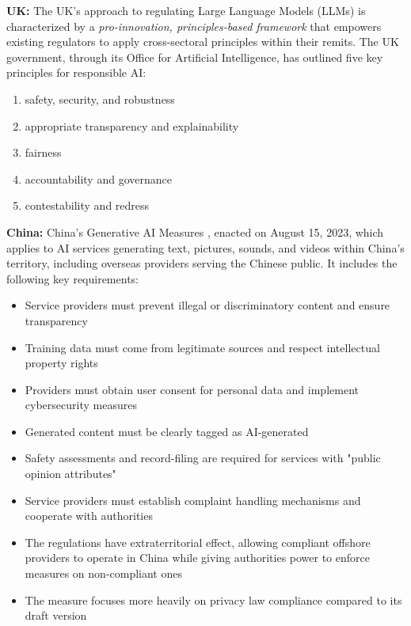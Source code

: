 \textbf{UK:} The UK's approach to regulating Large Language Models (LLMs)  is characterized by a \textit{pro-innovation, principles-based framework} that empowers existing regulators to apply cross-sectoral principles within their remits. The UK government, through its Office for Artificial Intelligence, has outlined five key principles for responsible AI:
\begin{enumerate}
    \item safety, security, and robustness
    \item appropriate transparency and explainability
    \item fairness
    \item accountability and governance
    \item contestability and redress
\end{enumerate}

\textbf{China:} China's Generative AI Measures , enacted on August 15, 2023, which applies to AI services generating text, pictures, sounds, and videos within China's territory, including overseas providers serving the Chinese public. It includes the following key requirements:
\begin{itemize}
    \item Service providers must prevent illegal or discriminatory content and ensure transparency
    \item Training data must come from legitimate sources and respect intellectual property rights
    \item Providers must obtain user consent for personal data and implement cybersecurity measures
    \item Generated content must be clearly tagged as AI-generated
    \item Safety assessments and record-filing are required for services with "public opinion attributes"
    \item Service providers must establish complaint handling mechanisms and cooperate with authorities
    \item The regulations have extraterritorial effect, allowing compliant offshore providers to operate in China while giving authorities power to enforce measures on non-compliant ones
    \item The measure focuses more heavily on privacy law compliance compared to its draft version
\end{itemize}

